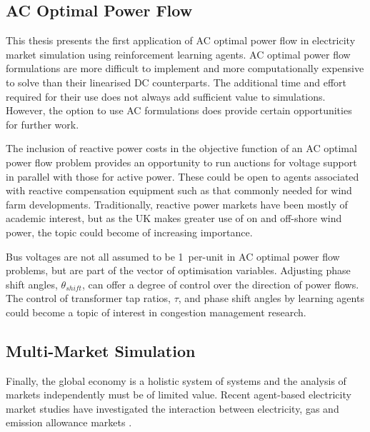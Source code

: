 
\subsection{AC Optimal Power Flow}
This thesis presents the first application of AC optimal power flow in
electricity market simulation using reinforcement learning agents.  AC optimal
power flow formulations are more difficult to implement and more computationally
expensive to solve than their linearised DC counterparts.  The additional time
and effort required for their use does not always add sufficient value to
simulations.  However, the option to use AC formulations does provide certain
opportunities for further work.

The inclusion of reactive power costs in the objective function of an AC optimal
power flow problem provides an opportunity to run auctions for voltage support
in parallel with those for active power.  These could be open to agents
associated with reactive compensation equipment such as that commonly needed for
wind farm developments.  Traditionally, reactive power markets have been mostly
of academic interest, but as the UK makes greater use of on and off-shore wind
power, the topic could become of increasing importance.

Bus voltages are not all assumed to be 1~per-unit in AC optimal power flow
problems, but are part of the vector of optimisation variables.  Adjusting phase
shift angles, $\theta_{shift}$, can offer a degree of control over the direction
of power flows.  The control of transformer tap ratios, $\tau$, and phase shift
angles by learning agents could become a topic of interest in congestion
management research.

\subsection{Multi-Market Simulation}
Finally, the global economy is a holistic system of systems and the analysis of
markets independently must be of limited value. Recent agent-based electricity
market studies have investigated the interaction between electricity, gas and
emission allowance markets \cite{krause:gas,wang:09}.

